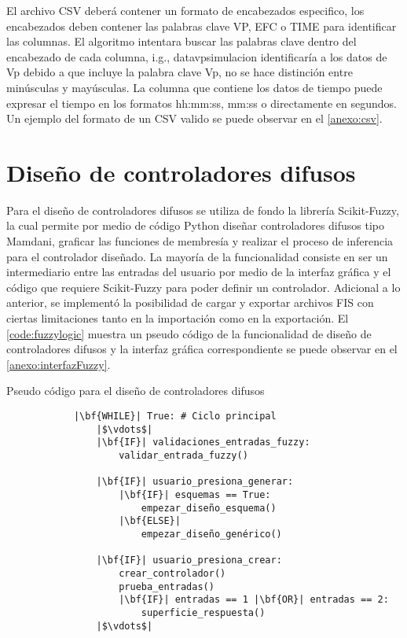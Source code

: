         El archivo CSV deberá contener un formato de encabezados especifico, los encabezados deben contener las palabras clave VP, EFC o TIME para identificar las columnas. El algoritmo intentara buscar las palabras clave dentro del encabezado de cada columna, i.g., datavpsimulacion identificaría a los datos de Vp debido a que incluye la palabra clave Vp, no se hace distinción entre minúsculas y mayúsculas. La columna que contiene los datos de tiempo puede expresar el tiempo en los formatos hh:mm:ss, mm:ss o directamente en segundos. Un ejemplo del formato de un CSV valido se puede observar en el \ref{anexo:csv}.

\section{Diseño de controladores difusos}
    
    Para el diseño de controladores difusos se utiliza de fondo la librería Scikit-Fuzzy, la cual permite por medio de código Python diseñar controladores difusos tipo Mamdani, graficar las funciones de membresía y realizar el proceso de inferencia para el controlador diseñado. La mayoría de la funcionalidad consiste en ser un intermediario entre las entradas del usuario por medio de la interfaz gráfica y el código que requiere Scikit-Fuzzy para poder definir un controlador. Adicional a lo anterior, se implementó la posibilidad de cargar y exportar archivos FIS con ciertas limitaciones tanto en la importación como en la exportación. El \cref{code:fuzzylogic} muestra un pseudo código de la funcionalidad de diseño de controladores difusos y la interfaz gráfica correspondiente se puede observar en el \ref{anexo:interfazFuzzy}.    

    \begin{longlisting}
        \caption[Pseudo código - Diseño de controladores difusos]{Pseudo código para el diseño de controladores difusos}
        \label{code:fuzzylogic}				
        \begin{verbatim}
            |\bf{WHILE}| True: # Ciclo principal
                |$\vdots$|
                |\bf{IF}| validaciones_entradas_fuzzy:
                    validar_entrada_fuzzy()
                
                |\bf{IF}| usuario_presiona_generar:
                    |\bf{IF}| esquemas == True:
                        empezar_diseño_esquema()
                    |\bf{ELSE}|
                        empezar_diseño_genérico()
                
                |\bf{IF}| usuario_presiona_crear:
                    crear_controlador()
                    prueba_entradas()
                    |\bf{IF}| entradas == 1 |\bf{OR}| entradas == 2:
                        superficie_respuesta()
                |$\vdots$|
        \end{verbatim}
    \end{longlisting}
    

